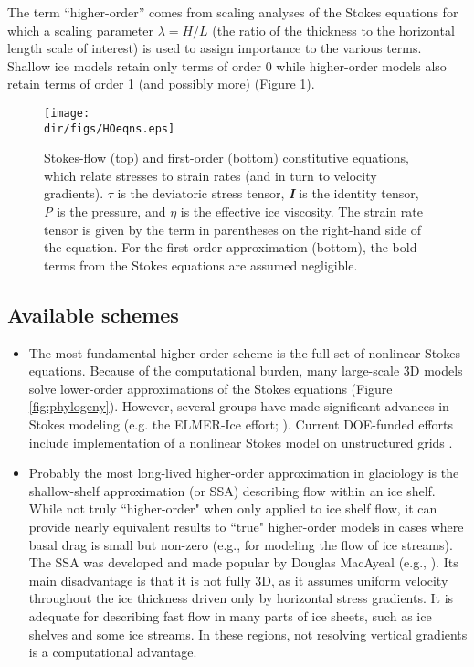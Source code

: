 The term ``higher-order'' comes from scaling analyses of the Stokes equations for which a scaling parameter $\lambda=H/L$ (the ratio of the thickness to the horizontal length scale of interest) is used to assign importance to the various terms. Shallow ice models retain only terms of order 0 while higher-order models also retain terms of order 1 (and possibly more) (Figure \ref{fig:hoeqns}). 

\begin{figure}
  \begin{center}
    \texttt{[image: \\dir/figs/HOeqns.eps]}
   \end{center}
  \caption{Stokes-flow (top) and first-order (bottom) constitutive equations, which relate stresses to strain rates (and in turn to velocity gradients). \textbf{$\tau$} is the deviatoric stress tensor, \textit{\textbf{I}} is the identity tensor, \textit{P} is the pressure, and $\eta$ is the effective ice viscosity. The strain rate tensor is given by the term in parentheses on the right-hand side of the equation. For the first-order approximation (bottom), the bold terms from the Stokes equations are assumed negligible.}
  \label{fig:hoeqns}
\end{figure} 

\subsection{Available schemes}

\begin{itemize}
\item The most fundamental higher-order scheme is the full set of nonlinear Stokes equations. Because of the computational burden, many large-scale 3D models solve lower-order approximations of the Stokes equations (Figure \ref{fig:phylogeny}). However, several groups have made significant advances in Stokes modeling
(e.g. the ELMER-Ice effort; \citet{gagliardini:2013iv}). 
Current DOE-funded efforts include implementation of a nonlinear Stokes model on unstructured grids \citep{Leng:2012ia}.
\end{itemize}

\begin{itemize}
\item 
Probably the most long-lived higher-order approximation in glaciology is the shallow-shelf approximation (or SSA) describing flow within an ice shelf. While not truly ``higher-order" when only applied to ice shelf flow, it can provide nearly equivalent results to ``true" higher-order models in cases where basal drag is small but non-zero (e.g., for modeling the flow of ice streams). The SSA was developed and made popular by Douglas MacAyeal (e.g., \citet{Macayeal:1989uo}). 
Its main disadvantage is that it is not fully 3D, as it assumes uniform velocity throughout the ice thickness driven only by horizontal stress gradients. It is adequate for describing fast flow in many parts of ice sheets, such as ice shelves and some ice streams. In these regions, not resolving vertical gradients is a computational advantage.   
\end{itemize}

